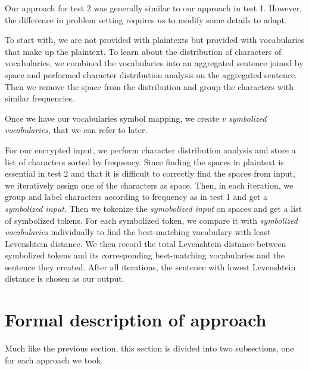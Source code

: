 \documentclass[12pt]{article}
\begin{document}
Our approach for test 2 was generally similar to our approach in test 1. However, the difference in problem setting requires us to modify some details to adapt.

To start with, we are not provided with plaintexts but provided with vocabularies that make up the plaintext. To learn about the distribution of characters of vocabularies, we combined the vocabularies into an aggregated sentence joined by space and performed character distribution analysis on the aggregated sentence. Then we remove the space from the distribution and group the characters with similar frequencies. 

Once we have our vocabularies symbol mapping, we create $v$ \emph{symbolized vocabularies}, that we can refer to later.

For our encrypted input, we perform character distribution analysis and store a list of characters sorted by frequency. Since finding the spaces in plaintext is essential in test 2 and that it is difficult to correctly find the spaces from input, we iteratively assign one of the characters as space. Then, in each iteration, we group and label characters according to frequency as in test 1 and get a \emph{symbolized input}. Then we tokenize the \emph{symobolized input} on spaces and get a list of symbolized tokens. For each symbolized token, we compare it with \emph{symbolized vocabularies} individually to find the best-matching vocabulary with least Levenshtein distance. We then record the total Levenshtein distance between symbolized tokens and its corresponding best-matching vocabularies and the sentence they created. After all iterations, the sentence with lowest Levenshtein distance is chosen as our output.


\section{Formal description of approach}
Much like the previous section, this section is divided into two subsections, one for each approach we took.
\end{document}
